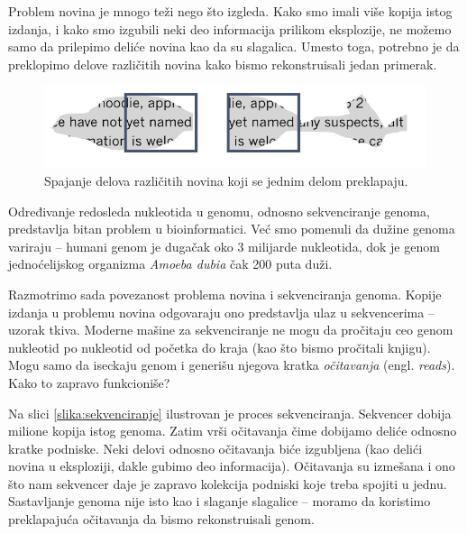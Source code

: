 Problem novina je mnogo teži nego što izgleda. Kako smo imali više kopija istog izdanja, i kako smo izgubili neki deo informacija prilikom eksplozije, ne možemo samo da prilepimo deliće novina kao da su slagalica. Umesto toga, potrebno je da preklopimo delove različitih novina kako bismo rekonstruisali jedan primerak.

\begin{figure}[h]
	\centering
	\includegraphics[width=1\textwidth]{poglavlja/3/slike/delici.png}
	\caption{Spajanje delova različitih novina koji se jednim delom preklapaju.}
	\label{slika:delici}
\end{figure} 

Određivanje redosleda nukleotida u genomu, odnosno sekvenciranje genoma, predstavlja bitan problem u bioinformatici. Ve\'c smo pomenuli da dužine genoma variraju -- humani genom je dugačak oko 3 milijarde nukleotida, dok je genom jednoćelijskog organizma \emph{Amoeba dubia} čak 200 puta duži. 

Razmotrimo sada povezanost problema novina i sekvenciranja genoma. Kopije izdanja u problemu novina odgovaraju ono predstavlja ulaz u sekvencerima -- uzorak tkiva. Moderne mašine za sekvenciranje ne mogu da pročitaju ceo genom nukleotid po nukleotid od početka do kraja (kao što bismo pročitali knjigu). Mogu samo da iseckaju genom i generišu njegova kratka \emph{očitavanja} (engl. \emph{reads}). Kako to zapravo funkcioniše? 

Na slici \ref{slika:sekvenciranje} ilustrovan je proces sekvenciranja. Sekvencer dobija milione kopija istog genoma. Zatim vrši očitavanja čime dobijamo deliće odnosno kratke podniske. Neki delovi odnosno očitavanja biće izgubljena (kao delići novina u eksploziji, dakle gubimo deo informacija). Očitavanja su izmešana i ono što nam sekvencer daje je zapravo kolekcija podniski koje treba spojiti u jednu. Sastavljanje genoma nije isto kao i slaganje slagalice -- moramo da koristimo preklapajuća očitavanja da bismo rekonstruisali genom.

